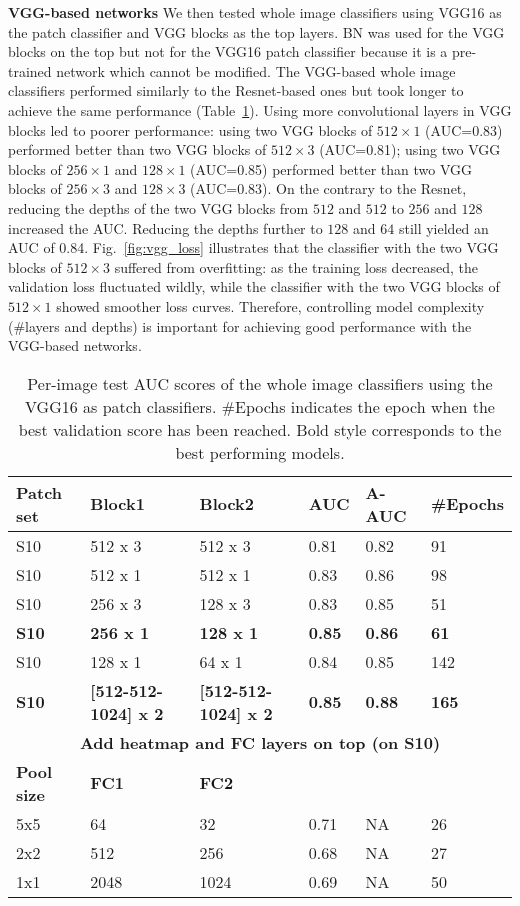 \documentclass[12pt,letterpaper]{article}
\begin{document}
\textbf{VGG-based networks}
\label{vgg_auc}
We then tested whole image classifiers using VGG16 as the patch classifier and VGG blocks as the top layers. BN was used for the VGG blocks on the top but not for the VGG16 patch classifier because it is a pre-trained network which cannot be modified. The VGG-based whole image classifiers performed similarly to the Resnet-based ones but took longer to achieve the same performance (Table~\ref{tab:vgg_auc}). Using more convolutional layers in VGG blocks led to poorer performance: using two VGG blocks of $512 \times 1$ (AUC=0.83) performed better than two VGG blocks of $512 \times 3$ (AUC=0.81); using two VGG blocks of $256 \times 1$ and $128 \times 1$ (AUC=0.85) performed better than two VGG blocks of $256 \times 3$ and $128 \times 3$ (AUC=0.83). On the contrary to the Resnet, reducing the depths of the two VGG blocks from $512$ and $512$ to $256$ and $128$ increased the AUC. Reducing the depths further to $128$ and $64$ still yielded an AUC of 0.84. Fig.~\ref{fig:vgg_loss} illustrates that the classifier with the two VGG blocks of $512 \times 3$ suffered from overfitting: as the training loss decreased, the validation loss fluctuated wildly, while the classifier with the two VGG blocks of $512 \times 1$ showed smoother loss curves. Therefore, controlling model complexity (\#layers and depths) is important for achieving good performance with the VGG-based networks.


\begin{table}
\centering
\caption{Per-image test AUC scores of the whole image classifiers using the VGG16 as patch classifiers. \#Epochs indicates the epoch when the best validation score has been reached. Bold style corresponds to the best performing models.}
\label{tab:vgg_auc}
\begin{tabular}{@{}llllll@{}}
\toprule
\textbf{Patch set} & \textbf{Block1} & \textbf{Block2} & \textbf{AUC} & \textbf{A-AUC} & \textbf{\#Epochs} \\ \midrule
S10 & 512 x 3 & 512 x 3 & 0.81 & 0.82 & 91 \\
S10 & 512 x 1 & 512 x 1 & 0.83 & 0.86 & 98 \\
S10 & 256 x 3 & 128 x 3 & 0.83 & 0.85 & 51 \\
\textbf{S10} & \textbf{256 x 1} & \textbf{128 x 1} & \textbf{0.85} & \textbf{0.86} & \textbf{61} \\
S10 & 128 x 1 & 64 x 1 & 0.84 & 0.85 & 142 \\
\textbf{S10} & \textbf{{[}512-512-1024{]} x 2} & \textbf{{[}512-512-1024{]} x 2} & \textbf{0.85} & \textbf{0.88} & \textbf{165} \\ \midrule
\multicolumn{6}{c}{\textbf{Add heatmap and FC layers on top (on S10)}} \\ \midrule
\textbf{Pool size} & \textbf{FC1} & \textbf{FC2} & \textbf{} & \textbf{} & \textbf{} \\
5x5 & 64 & 32 & 0.71 & NA & 26 \\
2x2 & 512 & 256 & 0.68 & NA & 27 \\
1x1 & 2048 & 1024 & 0.69 & NA & 50 \\ \bottomrule
\end{tabular}
\end{table}
\end{document}
